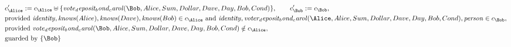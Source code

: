 \begin{align*}
&
c'_
{
\Alice
}
 := 
c_
{
\Alice
}
 \uplus 
\{
\mathit{
vote_deposit_bond_carol
}
(
\Bob
,
Alice
,
Sum
,
Dollar
,
Dave
,
Day
,
Bob
,
Cond
)
\}
, \qquad 
c'_
{
\Bob
}
 := 
c_
{
\Bob
}
,\\
&
\text{provided } 
\mathit{
identity
}
,
\mathit{
knows
}
(
Alice
)
,
\mathit{
knows
}
(
Dave
)
,
\mathit{
knows
}
(
Bob
)
 \in c_
{
\Alice
}
 \text{ and } 
\mathit{
identity
}
,
\mathit{
voter_deposit_bond_carol
}
(
\Alice
,
Alice
,
Sum
,
Dollar
,
Dave
,
Day
,
Bob
,
Cond
)
,
\mathit{
person
}
 \in c_
{
\Bob
}
,\\
&
\text{provided } 
\mathit{
vote_deposit_bond_carol
}
(
\Bob
,
Alice
,
Sum
,
Dollar
,
Dave
,
Day
,
Bob
,
Cond
)
 \notin c_
{
\Alice
}
,\\
&
\text{guarded by } \{
\Bob
\}
\end{align*}

